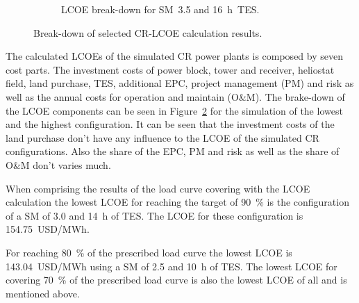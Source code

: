 \begin{figure}[!htbp]
\begin{subfigure}[b]{0.5\textwidth}
                \caption{LCOE break-down for SM~3.5 and \SI{16}{h}~TES.}\label{CR_LCOE_highinvest_BreakDown}
        \end{subfigure}
        \caption[Break-down of selected CR-LCOE calculation results.]{Break-down of selected CR-LCOE calculation results.}\label{CR_LCOE_BreakDown}
\end{figure}
The calculated LCOEs of the simulated CR power plants is composed by seven cost parts. The investment costs of power block, tower and receiver, heliostat field, land purchase, TES, additional EPC, project management (PM) and risk as well as the annual costs for operation and maintain (O\&M). The brake-down of the LCOE components can be seen in Figure~\ref{CR_LCOE_BreakDown} for the simulation of the lowest and the highest configuration.  It can be seen that the investment costs of the land purchase don't have any influence to the LCOE of the simulated CR configurations. Also the share of the EPC, PM and risk as well as the share of O\&M don't varies much.

When comprising the results of the load curve covering with the LCOE calculation the lowest LCOE for reaching the target of 90~\% is the configuration of a SM of 3.0 and \SI{14}{h} of TES. The LCOE for these configuration is \SI{154.75}{USD/MWh}. 

For reaching 80~\% of the prescribed load curve the lowest LCOE is \SI{143.04}{USD/MWh} using a SM of 2.5 and \SI{10}{h} of TES. The lowest LCOE for covering 70~\% of the prescribed load curve is also the lowest LCOE of all and is mentioned above.

\pagebreak